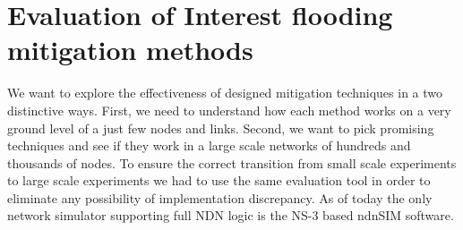 \section{Evaluation of Interest flooding mitigation methods}
\label{sec:evaluation}



We want to explore the effectiveness of designed mitigation techniques in a two distinctive ways. First, we need to understand how each method works on a very ground level of a just few nodes and links. Second, we want to pick promising techniques and see if they work in a large scale networks of hundreds and thousands of nodes. To ensure the correct transition from small scale experiments to large scale experiments we had to use the same evaluation tool in order to eliminate any possibility of implementation discrepancy. As of today the only network simulator supporting full NDN logic is the NS-3 based ndnSIM software. 




% 

